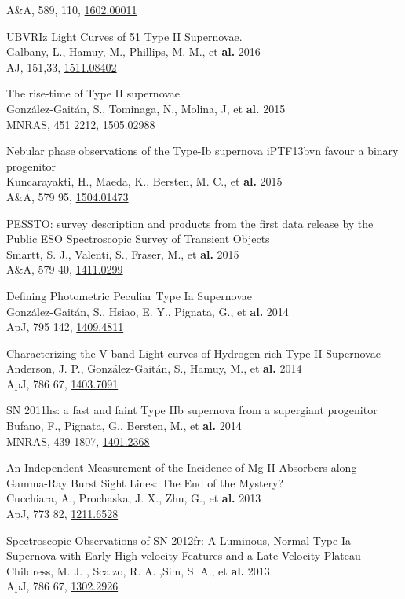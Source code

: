 \documentclass[12pt]{article}
\begin{document}
\begin{bibenum}
A\&A, 589, 110, \href{https://arxiv.org/abs/1602.00011}{1602.00011}
    \item 
UBVRIz Light Curves of 51 Type II Supernovae.\\
Galbany, L., Hamuy, M., Phillips, M. M., et \textbf{al.} 2016\\
AJ, 151,33, \href{http://arxiv.org/abs/1511.08402}{1511.08402}
    \item 
The rise-time of Type II supernovae\\
Gonz\'alez-Gait\'an, S., Tominaga, N., Molina, J, et \textbf{al.} 2015\\
MNRAS, 451 2212, \href{http://arxiv.org/abs/1505.02988}{1505.02988} 
    \item 
Nebular phase observations of the Type-Ib supernova iPTF13bvn favour a binary progenitor\\
Kuncarayakti, H., Maeda, K., Bersten, M. C., et \textbf{al.} 2015\\
A\&A, 579 95, \href{http://arxiv.org/abs/1504.01473}{1504.01473}  
    \item 
PESSTO: survey description and products from the first data release by the Public ESO Spectroscopic Survey of Transient Objects\\
Smartt, S. J., Valenti, S., Fraser, M., et \textbf{al.} 2015\\
A\&A, 579 40, \href{http://arxiv.org/abs/1411.0299}{1411.0299}
    \item 
Defining Photometric Peculiar Type Ia Supernovae\\
Gonz\'alez-Gait\'an, S., Hsiao, E. Y., Pignata, G., et \textbf{al.} 2014\\
ApJ, 795 142, \href{http://arxiv.org/abs/1409.4811}{1409.4811}    
    \item 
Characterizing the V-band Light-curves of Hydrogen-rich Type II Supernovae\\
Anderson, J. P., Gonz\'alez-Gait\'an, S., Hamuy, M.,  et \textbf{al.} 2014\\
ApJ, 786 67, \href{http://arxiv.org/abs/1403.7091}{1403.7091} 
    \item 
SN 2011hs: a fast and faint Type IIb supernova from a supergiant progenitor\\
Bufano, F., Pignata, G., Bersten, M., et \textbf{al.} 2014\\
MNRAS, 439 1807, \href{http://arxiv.org/abs/1401.2368}{1401.2368}
    \item 
An Independent Measurement of the Incidence of Mg II Absorbers along Gamma-Ray Burst Sight Lines: The End of the Mystery?\\
Cucchiara, A., Prochaska, J. X., Zhu, G.,  et \textbf{al.} 2013\\
ApJ, 773 82, \href{http://arxiv.org/abs/1211.6528}{1211.6528} 
    \item 
Spectroscopic Observations of SN 2012fr: A Luminous, Normal Type Ia Supernova with Early High-velocity Features and a Late Velocity Plateau\\
Childress, M. J. , Scalzo, R. A. ,Sim, S. A.,  et \textbf{al.} 2013\\
ApJ, 786 67, \href{http://arxiv.org/abs/1302.2926}{1302.2926\\} 


\end{bibenum}
\end{document}
